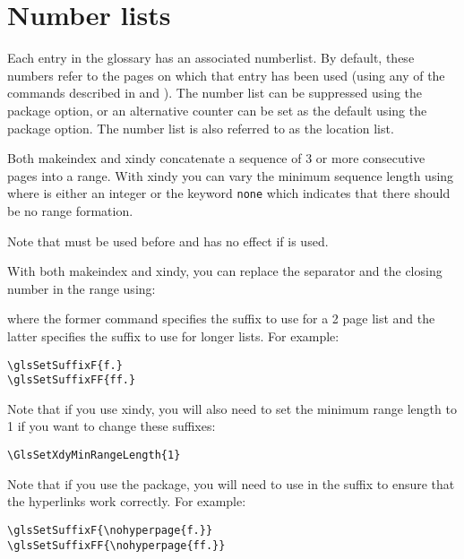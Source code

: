 \documentclass[report]{nlctdoc}
\begin{document}
\chapter{Number lists}
\label{sec:numberlists}

Each entry in the glossary has an associated \gls{numberlist}.
By default, these numbers refer to the pages on which that entry has
been used (using any of the commands described in
 and ). The number
list can be suppressed using the  package
option, or an alternative counter can be set as the default using
the  package option. The number list is also
referred to as the location list.

Both \gls{makeindex} and \gls{xindy} concatenate a
sequence of 3 or more consecutive pages into a range. With 
\gls*{xindy} you can vary the minimum sequence length using
 where  is either
an integer or the keyword \texttt{none} which indicates that there
should be no range formation.

\begin{important}
Note that  must be used before
 and has no effect if  is used.
\end{important}

With both \gls{makeindex} and \gls{xindy}, you can replace
the separator and the closing number in the range using:
\begin{definition}[\DescribeMacro{\glsSetSuffixF}]
\end{definition}
\begin{definition}[\DescribeMacro{\glsSetSuffixFF}]
\end{definition}
where the former command specifies the suffix to use for a 2 page
list and the latter specifies the suffix to use for longer lists.
For example:
\begin{verbatim}
\glsSetSuffixF{f.}
\glsSetSuffixFF{ff.}
\end{verbatim}
Note that if you use \gls{xindy}, you will also need to
set the minimum range length to 1 if you want to change these
suffixes:
\begin{verbatim}
\GlsSetXdyMinRangeLength{1}
\end{verbatim}
Note that if you use the  package, you will need
to use  in the suffix to ensure that the hyperlinks
work correctly. For example:
\begin{verbatim}
\glsSetSuffixF{\nohyperpage{f.}}
\glsSetSuffixFF{\nohyperpage{ff.}}
\end{verbatim}
\end{document}
